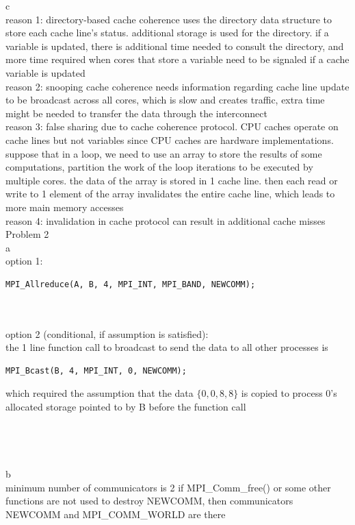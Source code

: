 \documentclass[12pt,border=4pt,multi]{article} %
\begin{document}
\newpage
\noindent
c\\
reason 1: directory-based cache coherence uses the directory data structure to store each cache line's status. additional storage is used for the directory. if a variable is updated, there is additional time needed to consult the directory, and more time required when cores that store a variable need to be signaled if a cache variable is updated\\ 
reason 2: snooping cache coherence needs information regarding cache line update to be broadcast across all cores, which is slow and creates traffic, extra time might be needed to transfer the data through the interconnect\\
reason 3: false sharing due to cache coherence protocol. CPU caches operate on cache lines but not variables since CPU caches are hardware implementations. suppose that in a loop, we need to use an array to store the results of some computations, partition the work of the loop iterations to be executed by multiple cores. the data of the array is stored in 1 cache line. then each read or write to 1 element of the array invalidates the entire cache line, which leads to more main memory accesses\\
reason 4: invalidation in cache protocol can result in additional cache misses\\
\newpage
\noindent
Problem 2\\
a\\
option 1:
\begin{lstlisting}
MPI_Allreduce(A, B, 4, MPI_INT, MPI_BAND, NEWCOMM);
\end{lstlisting}
\leavevmode
\\
\\
option 2 (conditional, if assumption is satisfied):\\
the 1 line function call to broadcast to send the data to all other processes is
\begin{lstlisting}
MPI_Bcast(B, 4, MPI_INT, 0, NEWCOMM);
\end{lstlisting}
which required the assumption that the data $\{0, 0, 8, 8\}$ is copied to process 0's allocated storage pointed to by B before the function call\\
\leavevmode
\\
\\
\\
\\
b\\
minimum number of communicators is 2 if MPI\_Comm\_free() or some other functions are not used to destroy NEWCOMM, then communicators NEWCOMM and MPI\_COMM\_WORLD are there\\
\end{document}
